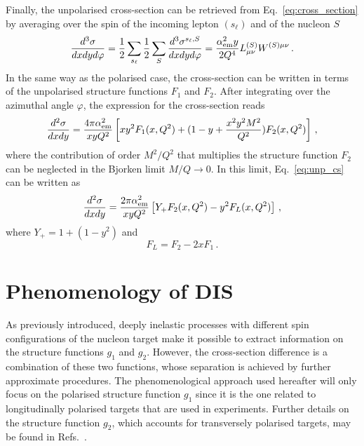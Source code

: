 Finally, the unpolarised cross-section can be retrieved from Eq.~\eqref{eq:cross_section} by averaging over the spin of the incoming lepton $(s_{\ell})$ and of the nucleon $S$
\begin{equation}
  \frac{d^3 \sigma}{dx dy d\varphi} = \frac{1}{2} \sum_{s_{\ell}} \frac{1}{2} \sum_{S} \frac{d^3 \sigma^{s_{\ell},S}}{dx dy d\varphi} = \frac{\alpha_{\textrm{em}}^2 y}{2 Q^4} L_{\mu \nu}^{(S)}W^{(S)\mu \nu}\,.
\end{equation}
In the same way as the polarised case, the cross-section can be written in terms of the unpolarised structure functions $F_1$ and $F_2$. After integrating over the azimuthal angle $\varphi$, the expression for the cross-section reads
\begin{equation}
  \frac{d^2 \sigma}{dx dy} = \frac{4 \pi \alpha_{\textrm{em}}^2}{xyQ^2} \left[ xy^2 F_1(x,Q^2) + (1-y + \frac{x^2y^2 M^2}{Q^2})F_{2}(x,Q^2)\right] \,,
  \label{eq:unp_cs}
\end{equation}
where the contribution of order $M^2/Q^2$ that multiplies the structure function $F_2$ can be neglected in the Bjorken limit $M/Q \rightarrow 0$. In this limit, Eq.~\eqref{eq:unp_cs} can be written as\\
\begin{equation}
  \frac{d^2 \sigma}{dx dy} = \frac{2 \pi \alpha_{\textrm{em}}^2}{xyQ^2} \left[ Y_{+} F_2(x,Q^2) - y^2 F_{L}(x,Q^2) \right]\,,
\end{equation} 
where $Y_{+} = 1 + (1-y^2)$ and 
\begin{equation}
  F_{L} = F_2 - 2xF_1 \,.
  \label{eq:Callan_Gross}
\end{equation}

\section{Phenomenology of DIS}
\label{sec:phenom_DIS}
As previously introduced, deeply inelastic processes with different spin configurations of the nucleon target make it possible to extract information on the structure functions $g_1$ and $g_2$. However, the cross-section difference is a combination of these two functions, whose separation is achieved by further approximate procedures. The phenomenological approach used hereafter will only focus on the polarised structure function $g_1$ since it is the one related to longitudinally polarised targets that are used in experiments. Further details on the structure function $g_2$, which accounts for transversely polarised targets, may be found in Refs.~\cites{leader_2001, Anselmino:1994gn,leader_predazzi_1996}.%

